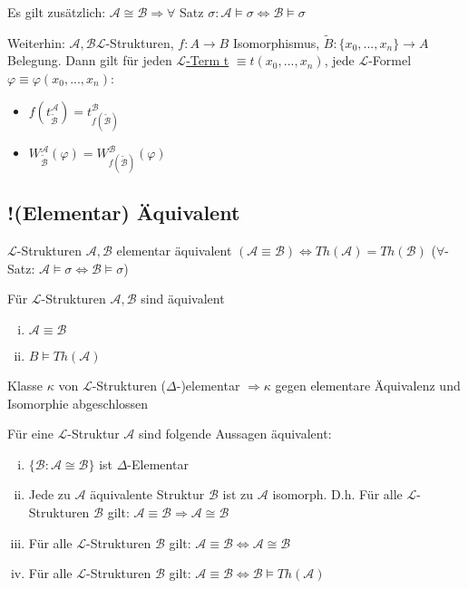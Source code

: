 \documentclass[12pt,a4paper]{article} %
\begin{document}
	Es gilt zusätzlich: $\mathcal{A} \cong \mathcal{B} \Rightarrow \forall$ Satz $\sigma: \mathcal{A} \vDash \sigma \Leftrightarrow \mathcal{B} \vDash \sigma$ 
	
	Weiterhin: $\mathcal{A}, \mathcal{B} \mathcal{L}$-Strukturen, $f: A \rightarrow B$ Isomorphismus, $\tilde{B}: \{x_0, ..., x_n\} \rightarrow A$ Belegung. Dann gilt für jeden \hyperref[Term]{$\mathcal{L}$-Term t} $\equiv t(x_0, ..., x_n)$, jede $\mathcal{L}$-Formel $\varphi \equiv \varphi(x_0, ..., x_n)$: \begin{itemize}
		\item $f(t_{\tilde{\mathcal{B}}}^{\mathcal{A}}) = t_{f(\tilde{\mathcal{B}})}^{\mathcal{B}}$
		\item $W_{\tilde{\mathcal{B}}}^{\mathcal{A}}(\varphi) = W_{f(\tilde{\mathcal{B}})}^{\mathcal{B}}(\varphi)$
	\end{itemize}
	
	\subsection{!(Elementar) Äquivalent}
	$\mathcal{L}$-Strukturen $\mathcal{A}, \mathcal{B}$ elementar äquivalent $(\mathcal{A} \equiv \mathcal{B}) \Leftrightarrow Th(\mathcal{A}) = Th(\mathcal{B})$ ($\forall$-Satz: $\mathcal{A} \vDash \sigma \Leftrightarrow \mathcal{B} \vDash \sigma$)
	
	Für $\mathcal{L}$-Strukturen $\mathcal{A}, \mathcal{B}$ sind äquivalent
	\begin{enumerate}[(i)]
		\item $\mathcal{A} \equiv \mathcal{B}$
		\item $B \vDash Th(\mathcal{A})$
	\end{enumerate}
	
	Klasse $\kappa$ von $\mathcal{L}$-Strukturen ($\Delta$-)elementar $\Rightarrow \kappa$ gegen elementare Äquivalenz und Isomorphie abgeschlossen 
	
	Für eine $\mathcal{L}$-Struktur $\mathcal{A}$ sind folgende Aussagen äquivalent:
	\begin{enumerate}[(i)]
		\item $\{\mathcal{B}: \mathcal{A} \cong \mathcal{B}\}$ ist $\Delta$-Elementar
		\item Jede zu $\mathcal{A}$ äquivalente Struktur $\mathcal{B}$ ist zu $\mathcal{A}$ isomorph. D.h. Für alle $\mathcal{L}$-Strukturen $\mathcal{B}$ gilt: $\mathcal{A} \equiv \mathcal{B} \Rightarrow \mathcal{A} \cong \mathcal{B}$
		\item Für alle $\mathcal{L}$-Strukturen $\mathcal{B}$ gilt: $\mathcal{A} \equiv \mathcal{B} \Leftrightarrow \mathcal{A} \cong \mathcal{B}$
		\item Für alle $\mathcal{L}$-Strukturen $\mathcal{B}$ gilt: $\mathcal{A} \equiv \mathcal{B} \Leftrightarrow \mathcal{B} \vDash Th(\mathcal{A})$
	\end{enumerate}
\end{document}
